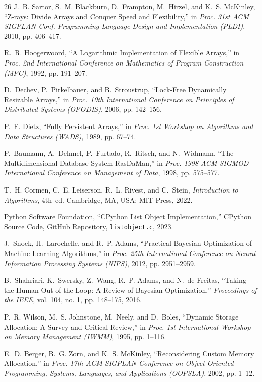 \documentclass[conference]{IEEEtran}
\begin{document}
\begin{thebibliography}{26}
J.~B. Sartor, S.~M. Blackburn, D.~Frampton, M.~Hirzel, and K.~S. McKinley, ``Z-rays: Divide Arrays and Conquer Speed and Flexibility,'' in \emph{Proc. 31st ACM SIGPLAN Conf. Programming Language Design and Implementation (PLDI)}, 2010, pp. 406--417.

R.~R. Hoogerwoord, ``A Logarithmic Implementation of Flexible Arrays,'' in \emph{Proc. 2nd International Conference on Mathematics of Program Construction (MPC)}, 1992, pp. 191--207.

D.~Dechev, P.~Pirkelbauer, and B.~Stroustrup, ``Lock-Free Dynamically Resizable Arrays,'' in \emph{Proc. 10th International Conference on Principles of Distributed Systems (OPODIS)}, 2006, pp. 142--156.

P.~F. Dietz, ``Fully Persistent Arrays,'' in \emph{Proc. 1st Workshop on Algorithms and Data Structures (WADS)}, 1989, pp. 67--74.

P.~Baumann, A.~Dehmel, P.~Furtado, R.~Ritsch, and N.~Widmann, ``The Multidimensional Database System RasDaMan,'' in \emph{Proc. 1998 ACM SIGMOD International Conference on Management of Data}, 1998, pp. 575--577.

T.~H. Cormen, C.~E. Leiserson, R.~L. Rivest, and C.~Stein, \emph{Introduction to Algorithms}, 4th~ed. Cambridge, MA, USA: MIT Press, 2022.

Python Software Foundation, ``CPython List Object Implementation,'' CPython Source Code, GitHub Repository, \texttt{listobject.c}, 2023.

J.~Snoek, H.~Larochelle, and R.~P. Adams, ``Practical Bayesian Optimization of Machine Learning Algorithms,'' in \emph{Proc. 25th International Conference on Neural Information Processing Systems (NIPS)}, 2012, pp. 2951--2959.

B.~Shahriari, K.~Swersky, Z.~Wang, R.~P. Adams, and N.~de Freitas, ``Taking the Human Out of the Loop: A Review of Bayesian Optimization,'' \emph{Proceedings of the IEEE}, vol. 104, no. 1, pp. 148--175, 2016.

P.~R. Wilson, M.~S. Johnstone, M.~Neely, and D.~Boles, ``Dynamic Storage Allocation: A Survey and Critical Review,'' in \emph{Proc. 1st International Workshop on Memory Management (IWMM)}, 1995, pp. 1--116.

E.~D. Berger, B.~G. Zorn, and K.~S. McKinley, ``Reconsidering Custom Memory Allocation,'' in \emph{Proc. 17th ACM SIGPLAN Conference on Object-Oriented Programming, Systems, Languages, and Applications (OOPSLA)}, 2002, pp. 1--12.


\end{thebibliography}
\end{document}
